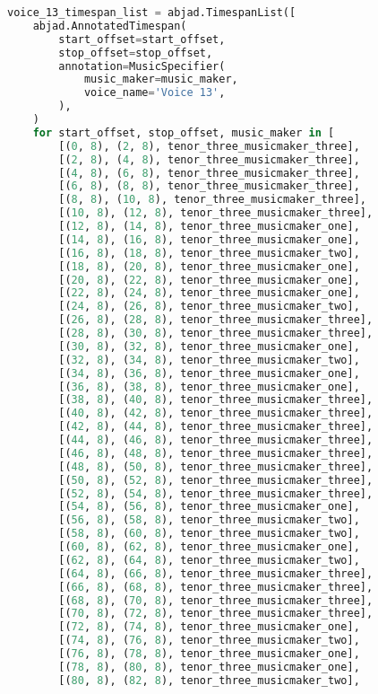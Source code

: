 \begin{lstlisting}[language=Python, caption=Invocation Source Code]
voice_13_timespan_list = abjad.TimespanList([
    abjad.AnnotatedTimespan(
        start_offset=start_offset,
        stop_offset=stop_offset,
        annotation=MusicSpecifier(
            music_maker=music_maker,
            voice_name='Voice 13',
        ),
    )
    for start_offset, stop_offset, music_maker in [
        [(0, 8), (2, 8), tenor_three_musicmaker_three],
        [(2, 8), (4, 8), tenor_three_musicmaker_three],
        [(4, 8), (6, 8), tenor_three_musicmaker_three],
        [(6, 8), (8, 8), tenor_three_musicmaker_three],
        [(8, 8), (10, 8), tenor_three_musicmaker_three],
        [(10, 8), (12, 8), tenor_three_musicmaker_three],
        [(12, 8), (14, 8), tenor_three_musicmaker_one],
        [(14, 8), (16, 8), tenor_three_musicmaker_one],
        [(16, 8), (18, 8), tenor_three_musicmaker_two],
        [(18, 8), (20, 8), tenor_three_musicmaker_one],
        [(20, 8), (22, 8), tenor_three_musicmaker_one],
        [(22, 8), (24, 8), tenor_three_musicmaker_one],
        [(24, 8), (26, 8), tenor_three_musicmaker_two],
        [(26, 8), (28, 8), tenor_three_musicmaker_three],
        [(28, 8), (30, 8), tenor_three_musicmaker_three],
        [(30, 8), (32, 8), tenor_three_musicmaker_one],
        [(32, 8), (34, 8), tenor_three_musicmaker_two],
        [(34, 8), (36, 8), tenor_three_musicmaker_one],
        [(36, 8), (38, 8), tenor_three_musicmaker_one],
        [(38, 8), (40, 8), tenor_three_musicmaker_three],
        [(40, 8), (42, 8), tenor_three_musicmaker_three],
        [(42, 8), (44, 8), tenor_three_musicmaker_three],
        [(44, 8), (46, 8), tenor_three_musicmaker_three],
        [(46, 8), (48, 8), tenor_three_musicmaker_three],
        [(48, 8), (50, 8), tenor_three_musicmaker_three],
        [(50, 8), (52, 8), tenor_three_musicmaker_three],
        [(52, 8), (54, 8), tenor_three_musicmaker_three],
        [(54, 8), (56, 8), tenor_three_musicmaker_one],
        [(56, 8), (58, 8), tenor_three_musicmaker_two],
        [(58, 8), (60, 8), tenor_three_musicmaker_two],
        [(60, 8), (62, 8), tenor_three_musicmaker_one],
        [(62, 8), (64, 8), tenor_three_musicmaker_two],
        [(64, 8), (66, 8), tenor_three_musicmaker_three],
        [(66, 8), (68, 8), tenor_three_musicmaker_three],
        [(68, 8), (70, 8), tenor_three_musicmaker_three],
        [(70, 8), (72, 8), tenor_three_musicmaker_three],
        [(72, 8), (74, 8), tenor_three_musicmaker_one],
        [(74, 8), (76, 8), tenor_three_musicmaker_two],
        [(76, 8), (78, 8), tenor_three_musicmaker_one],
        [(78, 8), (80, 8), tenor_three_musicmaker_one],
        [(80, 8), (82, 8), tenor_three_musicmaker_two],

\end{lstlisting}
